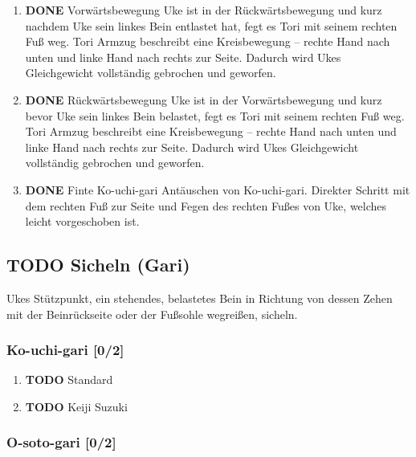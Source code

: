 \documentclass[11pt]{article}
\begin{document}
\begin{enumerate}
\item {\bfseries\sffamily DONE} Vorwärtsbewegung
\label{sec:org89adaf5}
Uke ist in der Rückwärtsbewegung und kurz nachdem Uke sein linkes Bein entlastet hat, fegt es Tori mit seinem rechten Fuß weg. Tori Armzug beschreibt eine Kreisbewegung – rechte Hand nach unten und linke Hand nach rechts zur Seite. Dadurch wird Ukes Gleichgewicht vollständig gebrochen und geworfen.

\item {\bfseries\sffamily DONE} Rückwärtsbewegung
\label{sec:orgcd44ee0}
Uke ist in der Vorwärtsbewegung und kurz bevor Uke sein linkes Bein belastet, fegt es Tori mit seinem rechten Fuß weg. Tori Armzug beschreibt eine Kreisbewegung – rechte Hand nach unten und linke Hand nach rechts zur Seite. Dadurch wird Ukes Gleichgewicht vollständig gebrochen und geworfen.

\item {\bfseries\sffamily DONE} Finte Ko-uchi-gari
\label{sec:org879ecb3}
Antäuschen von Ko-uchi-gari. Direkter Schritt mit dem rechten Fuß zur Seite und Fegen des rechten Fußes von Uke, welches leicht vorgeschoben ist.
\end{enumerate}

\subsection{{\bfseries\sffamily TODO} Sicheln (Gari)}
\label{sec:org5da500e}

Ukes Stützpunkt, ein stehendes, belastetes Bein in Richtung von dessen Zehen mit der Beinrückseite
oder der Fußsohle wegreißen, sicheln.

\subsubsection{Ko-uchi-gari [0/2]}
\label{sec:orgbc1baa4}

\begin{enumerate}
\item {\bfseries\sffamily TODO} Standard
\label{sec:orgd8cb33f}

\item {\bfseries\sffamily TODO} Keiji Suzuki
\label{sec:org4c12383}
\end{enumerate}

\subsubsection{O-soto-gari [0/2]}
\label{sec:org1033809}
\end{document}
